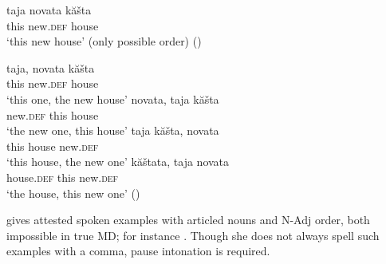 \documentclass[output=paper,
colorlinks,
citecolor=brown,
newtxmath
]{langscibook}
\begin{document}
\ea \label{house}
\gll taja novata kăšta\\
this new.\textsc{def} house\\
\glt `this new house’ 	(only possible order) \hfill()
\z


\ea \label{houses}
\ea \label{houses1}
\gll taja, novata kăšta\\
this new.\textsc{def} house\\
\glt `this one, the new house’
\ex \label{houses2}
\gll novata, taja kăšta \\
    new.\textsc{def} this house \\
    \glt `the new one, this house'
\ex \label{houses3}
\gll taja kăšta, novata \\
     this house new.\textsc{def}\\
    \glt `this house, the new one'
\ex \label{houses4}
\gll kăštata, taja  novata \\
     house.\textsc{def} this new.\textsc{def}\\
    \glt `the house, this new one' \hfill ()
\z
\z

\noindent \citet{Angelova1994} gives attested spoken examples with articled nouns and N-Adj order, both impossible in true MD; for instance . Though she does not always spell such examples with a comma, pause intonation is required.
\end{document}
